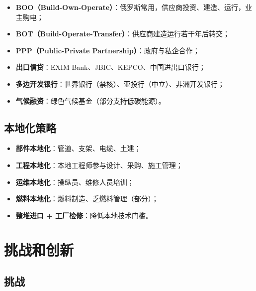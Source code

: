 \documentclass[
  UTF8,
  scheme=plain,
  fontsize=10pt,
  openany
]{ctexbook}
\begin{document}
\begin{itemize}
\tightlist
\item
  \textbf{BOO（Build-Own-Operate）}：俄罗斯常用，供应商投资、建造、运行，业主购电；
\item
  \textbf{BOT（Build-Operate-Transfer）}：供应商建造运行若干年后转交；
\item
  \textbf{PPP（Public-Private Partnership）}：政府与私企合作；
\item
  \textbf{出口信贷}：EXIM Bank、JBIC、KEPCO、中国进出口银行；
\item
  \textbf{多边开发银行}：世界银行（禁核）、亚投行（中立）、非洲开发银行；
\item
  \textbf{气候融资}：绿色气候基金（部分支持低碳能源）。
\end{itemize}

\subsection{本地化策略}\label{ux672cux5730ux5316ux7b56ux7565}

\begin{itemize}
\tightlist
\item
  \textbf{部件本地化}：管道、支架、电缆、土建；
\item
  \textbf{工程本地化}：本地工程师参与设计、采购、施工管理；
\item
  \textbf{运维本地化}：操纵员、维修人员培训；
\item
  \textbf{燃料本地化}：燃料制造、乏燃料管理（部分）；
\item
  \textbf{整堆进口 + 工厂检修}：降低本地技术门槛。
\end{itemize}

\section{挑战和创新}\label{ux6311ux6218ux548cux521bux65b0}

\subsection{挑战}\label{ux6311ux6218-3}
\end{document}
